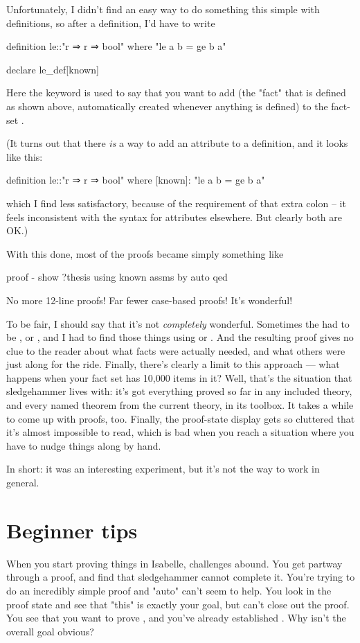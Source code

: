 Unfortunately, I didn't find an easy way to do something this simple with definitions, so after a definition, I'd have to write
\begin{IS}
definition le::"r ⇒ r ⇒ bool"
  where "le a b = ge b a" 

declare le_def[known]
\end{IS}
Here the keyword  is used to say that you want to add  (the "fact" that  is defined as shown above, automatically created whenever anything is defined) to the fact-set . 

(It turns out that there \textit{is} a way to add an attribute to a definition, and it looks like this:
\begin{IS}
definition le::"r ⇒ r ⇒ bool"
  where [known]: "le a b = ge b a" 
\end{IS}
which I find less satisfactory, because of the requirement of that extra colon -- it feels inconsistent with the syntax for attributes elsewhere. But clearly both are OK.)

With this done, most of the proofs became simply something like
\begin{IS}
proof -
  show ?thesis using known assms by auto
qed
\end{IS}
No more 12-line proofs! Far fewer case-based proofs! It's wonderful! 

To be fair, I should say that it's not \textit{completely} wonderful. Sometimes the  had to be , or , and I had to find those things using  or . And the resulting proof gives no clue to the reader about what facts were actually needed, and what others were just along for the ride. Finally, there's clearly a limit to this approach --- what happens when your fact set has 10,000 items in it? Well, that's the situation that sledgehammer lives with: it's got everything proved so far in any included theory, and every named theorem from the current theory, in its toolbox. It takes a while to come up with proofs, too. Finally, the proof-state display gets so cluttered that it's almost impossible to read, which is bad when you reach a situation where you have to nudge things along by hand. 

In short: it was an interesting experiment, but it's not the way to work in general. 

\section{Beginner tips}
When you start proving things in Isabelle, challenges abound. You get partway through a proof, and find that sledgehammer cannot complete it. You're trying to do an incredibly simple proof and "auto" can't seem to help. You look in the proof state and see that "this" is exactly your goal, but can't close out the proof. You see that you want to prove , and you've already established . Why isn't the overall goal obvious? 

